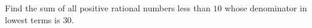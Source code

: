 Find the sum of all positive rational numbers less than $10$ whose denominator in lowest terms is $30$.
